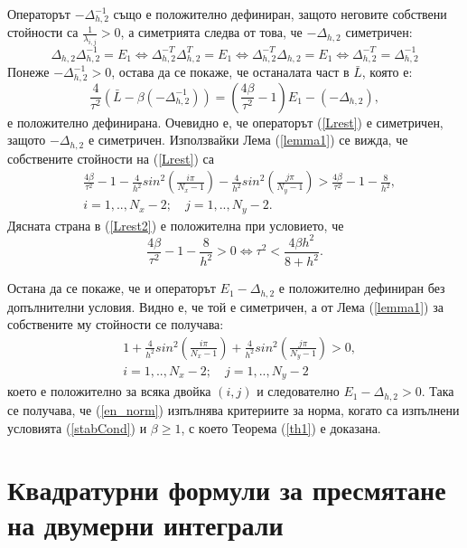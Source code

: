 \documentclass{article}
\newcommand{\be}{\begin{equation}}
\newcommand{\ee}{\end{equation}}
\newcommand{\rf}[1]{(\ref{#1})}
\begin{document}
Операторът $-\Delta_{h,2}^{-1}$ също е положително дефиниран, защото неговите собствени стойности са $\frac{1}{\lambda_{i,j}} > 0$, а симетрията следва от това, че $-\Delta_{h,2}$ симетричен:
\begin{equation*}
\Delta_{h,2}  \Delta_{h,2}^{-1} = E_1 \Leftrightarrow \Delta_{h,2}^{-T}  \Delta_{h,2}^{T} = E_1 \Leftrightarrow \Delta_{h,2}^{-T}  \Delta_{h,2} = E_1 
\Leftrightarrow \Delta_{h,2}^{-T} = \Delta_{h,2}^{-1} 
\end{equation*}
Понеже $-\Delta_{h,2}^{-1} > 0$, остава да се покаже, че останалата част в $\bar L$, която е:
\be\label{Lrest}
\frac{4}{\tau^2}\left( \bar L - \beta ( - \Delta_{h,2}^{-1}) \right) = \left( \frac{4 \beta}{\tau^2} - 1\right) E_1 -(-\Delta_{h,2}),
\ee
е положително дефинирана. Очевидно е, че операторът \rf{Lrest} е симетричен, защото $-\Delta_{h,2}$ е симетричен. Използвайки Лема \rf{lemma1} се вижда, че собствените стойности на \rf{Lrest} са
\begin{align}\label{Lrest2}
 &\frac{4 \beta}{\tau^2} - 1 - \frac{4}{h^2}sin^2(\frac{i \pi}{N_x-1}) - \frac{4}{h^2}sin^2(\frac{j \pi}{N_y-1}) > \frac{4 \beta}{\tau^2} - 1 - \frac{8}{h^2}, \\
&i = 1,..,N_x-2; \quad j = 1, .. , N_y-2. \nonumber
\end{align}
Дясната страна в \rf{Lrest2} е положителна при условието, че
\be\label{stabCond}
\frac{4 \beta}{\tau^2} - 1 - \frac{8}{h^2} > 0  \Leftrightarrow \tau^2 < \frac{4 \beta h^2}{8 + h^2}.
\ee

Остана да се покаже, че и операторът $E_1 - \Delta_{h, 2}$ е положително дефиниран без допълнителни условия. Видно е, че той е симетричен, а от Лема \rf{lemma1} за собствените му стойности се получава:
\begin{align}
&1+ \frac{4}{h^2}sin^2(\frac{i \pi}{N_x-1}) + \frac{4}{h^2}sin^2(\frac{j \pi}{N_y-1}) >0, \nonumber\\
&i = 1,..,N_x-2; \quad j = 1, .. , N_y-2 \nonumber
\end{align}
което е положително за всяка двойка $(i, j)$ и следователно $E_1 - \Delta_{h, 2} > 0$. Така се получава, че \rf{en_norm} изпълнява критериите за норма, когато са изпълнени условията \rf{stabCond} и $\beta \ge 1$, с което Теорема \rf{th1} е доказана.

\section{Квадратурни формули за пресмятане на двумерни интеграли}
\end{document}
